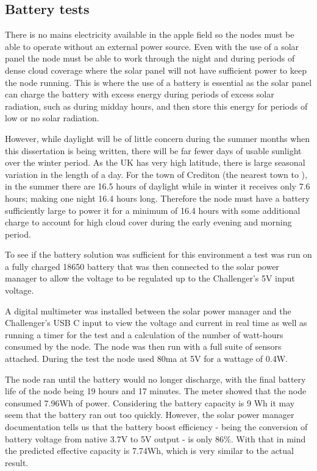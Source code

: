 \subsection{Battery tests}\label{sec:battery-tests}

There is no mains electricity available in the apple field so the nodes must be
able to operate without an external power source. Even with the use of a solar
panel the node must be able to work through the night and during periods of
dense cloud coverage where the solar panel will not have sufficient power to
keep the node running. This is where the use of a battery is essential as the
solar panel can charge the battery with excess energy during periods of excess
solar radiation, such as during midday hours, and then store this energy for
periods of low or no solar radiation.

However, while daylight will be of little concern during the summer months when
this dissertation is being written, there will be far fewer days of usable
sunlight over the winter period. As the UK has very high latitude, there is
large seasonal variation in the length of a day. For the town of Crediton (the
nearest town to \farmName), in the summer there are 16.5 hours of daylight while
in winter it receives only 7.6 hours; making one night 16.4 hours long.
Therefore the node must have a battery sufficiently large to power it for a
minimum of 16.4 hours with some additional charge to account for high cloud
cover during the early evening and morning period.

To see if the battery solution was sufficient for this environment a test was
run on a fully charged 18650 battery that was then connected to the solar power
manager to allow the voltage to be regulated up to the Challenger's 5V input
voltage.

A digital multimeter was installed between the solar power manager and the
Challenger's USB C input to view the voltage and current in real time as well as
running a timer for the test and a calculation of the number of watt-hours
consumed by the node. The node was then run with a full suite of sensors
attached. During the test the node used 80ma at 5V for a wattage of 0.4W.

The node ran until the battery would no longer discharge, with the final battery
life of the node being 19 hours and 17 minutes. The meter showed that the node
consumed 7.96Wh of power. Considering the battery capacity is 9 Wh it may seem
that the battery ran out too quickly. However, the solar power manager
documentation \cite{waveshare} tells us that the battery boost efficiency -
being the conversion of battery voltage from native 3.7V to 5V output - is only
86\%. With that in mind the predicted effective capacity is 7.74Wh, which is
very similar to the actual result.

